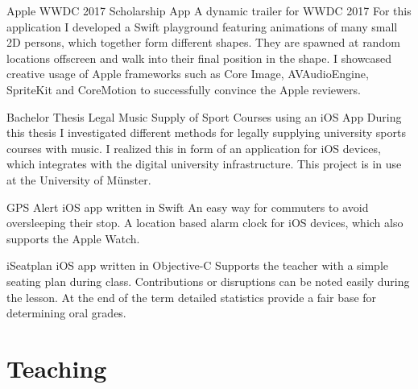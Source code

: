\documentclass[11pt,a4paper,sans]{moderncv}        %
\begin{document}
                    {Apple WWDC 2017 Scholarship App}
					{A dynamic trailer for WWDC 2017}{}
					{}
                    {For this application I developed a Swift playground featuring animations of                        many small 2D persons, which together form different shapes. They are spawned at random locations offscreen and walk into their final position in the shape. 
                    I showcased creative usage of Apple frameworks such as Core Image, AVAudioEngine, SpriteKit and CoreMotion to successfully convince the Apple reviewers.}

					{Bachelor Thesis}
					{Legal Music Supply of Sport Courses using an iOS App}{}
					{}
					{During this thesis I investigated different methods for legally supplying university sports courses with music. I realized this in form of an application for iOS devices, which integrates with the digital university infrastructure. This project is in use at the University of Münster.}
								 
					{GPS Alert}
					{iOS app written in Swift}{}
					{}
					{An easy way for commuters to avoid oversleeping their stop. A location based alarm clock for iOS devices, which also supports the Apple Watch.}
					

					{iSeatplan}
					{iOS app written in Objective-C}{}
					{}
					{Supports the teacher with a simple seating plan during class. Contributions or disruptions can be
noted easily during the lesson. At the end of the term detailed statistics provide a fair base for determining oral
grades.}
					

\section{Teaching}

\end{document}
